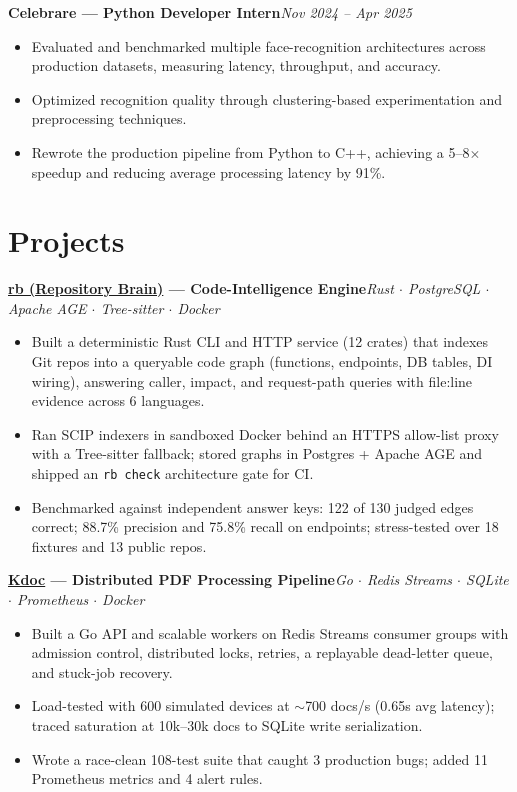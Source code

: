 \documentclass[10pt,a4paper]{article}
\newcommand{\entry}[2]{\textbf{#1}\hfill\textit{#2}\par}
\begin{document}
\entry{Celebrare --- Python Developer Intern}{Nov 2024 -- Apr 2025}
\begin{itemize}
\item Evaluated and benchmarked multiple face-recognition architectures across production datasets, measuring latency, throughput, and accuracy.
\item Optimized recognition quality through clustering-based experimentation and preprocessing techniques.
\item Rewrote the production pipeline from Python to C++, achieving a 5--8$\times$ speedup and reducing average processing latency by 91\%.
\end{itemize}

\section*{Projects}
\entry{\href{https://github.com/rohiitgit/rb}{rb (Repository Brain)} --- Code-Intelligence Engine}{Rust $\cdot$ PostgreSQL $\cdot$ Apache AGE $\cdot$ Tree-sitter $\cdot$ Docker}
\begin{itemize}
\item Built a deterministic Rust CLI and HTTP service (12 crates) that indexes Git repos into a queryable code graph (functions, endpoints, DB tables, DI wiring), answering caller, impact, and request-path queries with file:line evidence across 6 languages.
\item Ran SCIP indexers in sandboxed Docker behind an HTTPS allow-list proxy with a Tree-sitter fallback; stored graphs in Postgres + Apache AGE and shipped an \texttt{rb check} architecture gate for CI.
\item Benchmarked against independent answer keys: 122 of 130 judged edges correct; 88.7\% precision and 75.8\% recall on endpoints; stress-tested over 18 fixtures and 13 public repos.
\end{itemize}
\entry{\href{https://github.com/rohiitgit/kdoc}{Kdoc} --- Distributed PDF Processing Pipeline}{Go $\cdot$ Redis Streams $\cdot$ SQLite $\cdot$ Prometheus $\cdot$ Docker}
\begin{itemize}
\item Built a Go API and scalable workers on Redis Streams consumer groups with admission control, distributed locks, retries, a replayable dead-letter queue, and stuck-job recovery.
\item Load-tested with 600 simulated devices at $\sim$700 docs/s (0.65s avg latency); traced saturation at 10k--30k docs to SQLite write serialization.
\item Wrote a race-clean 108-test suite that caught 3 production bugs; added 11 Prometheus metrics and 4 alert rules.
\end{itemize}
\end{document}
